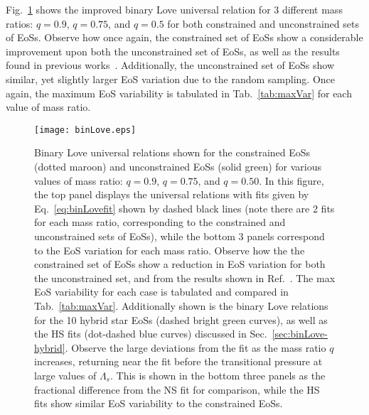 \documentclass[prd,twocolumn,nofootinbib,superscriptaddress,amsmath,amssymb]{revtex4-1}
\begin{document}
Fig.~\ref{fig:binLove} shows the improved binary Love universal relation for 3 different mass ratios: $q=0.9$, $q=0.75$, and $q=0.5$ for both constrained and unconstrained sets of EoSs.
Observe how once again, the constrained set of EoSs show a considerable improvement upon both the unconstrained set of EoSs, as well as the results found in previous works~\cite{Yagi:binLove}.
Additionally, the unconstrained set of EoSs show similar, yet slightly larger EoS variation due to the random sampling.
Once again, the maximum EoS variability is tabulated in Tab.~\ref{tab:maxVar} for each value of mass ratio.

\begin{figure}
\begin{center} 
\texttt{[image: binLove.eps]}
\end{center}
\caption{
Binary Love universal relations shown for the constrained EoSs (dotted maroon) and unconstrained EoSs (solid green) for various values of mass ratio: $q=0.9$, $q=0.75$, and $q=0.50$.
In this figure, the top panel displays the universal relations with fits given by Eq.~\ref{eq:binLovefit} shown by dashed black lines (note there are 2 fits for each mass ratio, corresponding to the constrained and unconstrained sets of EoSs), while the bottom 3 panels correspond to the EoS variation for each mass ratio.
Observe how the the constrained set of EoSs show a reduction in EoS variation for both the unconstrained set, and from the results shown in Ref.~\cite{Yagi:binLove}.
The max EoS variability for each case is tabulated and compared in Tab.~\ref{tab:maxVar}.
Additionally shown is the binary Love relations for the 10 hybrid star EoSs (dashed bright green curves), as well as the HS fits (dot-dashed blue curves) discussed in Sec.~\ref{sec:binLove-hybrid}.
Observe the large deviations from the fit as the mass ratio $q$ increases, returning near the fit before the transitional pressure at large values of $\Lambda_s$.
This is shown in the bottom three panels as the fractional difference from the NS fit for comparison, while the HS fits show similar EoS variability to the constrained EoSs.
}
\label{fig:binLove}
\end{figure} 
\end{document}
